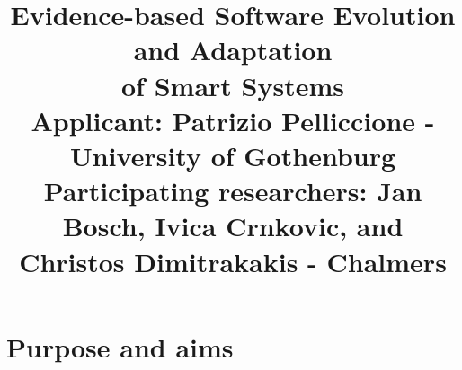 \documentclass[12pt]{article}
\date{}
\begin{document}
\title{\vspace{-2cm}Evidence-based Software Evolution and Adaptation \\of Smart Systems\\ \vspace{.2cm} {\normalsize {\bf Applicant}: Patrizio Pelliccione - University of Gothenburg}\\ \vspace{-.2cm} {\normalsize {\bf Participating researchers}: Jan Bosch, Ivica Crnkovic, and Christos Dimitrakakis - Chalmers}}

\renewcommand{\footskip}{20pt}
 
\newcommand{\name}{{\tt EVO\&ADA}} 

\maketitle

\vspace{-2cm}

\section{Purpose and aims}\label{sec:purpose}
\vspace{-.4cm}
\end{document}
